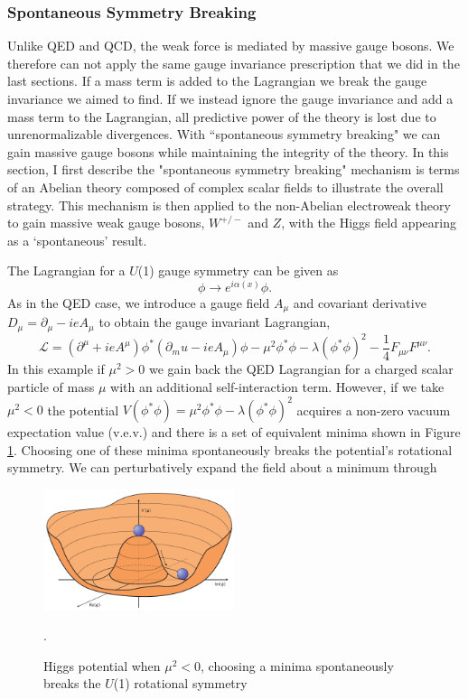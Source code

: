 \subsubsection{Spontaneous Symmetry Breaking}
Unlike QED and QCD, the weak force is mediated by massive gauge bosons. We therefore can not apply the same gauge invariance prescription that we did in the last sections. If a mass term is added to the Lagrangian we break the gauge invariance we aimed to find. If we instead ignore the gauge invariance and add a mass term to the Lagrangian, all predictive power of the theory is lost due to unrenormalizable divergences. With ``spontaneous symmetry breaking" we can gain massive gauge bosons while maintaining the integrity of the theory. In this section, I first describe the "spontaneous symmetry breaking" mechanism is terms of an Abelian theory composed of complex scalar fields to illustrate the overall strategy. This mechanism is then applied to the non-Abelian electroweak theory to gain massive weak gauge bosons, $W^{+/-}$ and $Z$, with the Higgs field appearing as a `spontaneous' result.

The Lagrangian for a $U$(1) gauge symmetry can be given as 
\begin{equation}
\phi \rightarrow e^{i\alpha(x)}\phi.
\end{equation}
As in the QED case, we introduce a gauge field $A_\mu$ and covariant derivative $D_\mu = \partial_\mu - ieA_\mu$ to obtain the gauge invariant Lagrangian,
\begin{equation}
\mathcal{L} = (\partial^\mu+ieA^\mu)\phi^*(\partial_mu-ieA_\mu)\phi-\mu^2\phi^*\phi-\lambda(\phi^*\phi)^2-\frac{1}{4}F_{\mu\nu}F^{\mu\nu}.
\end{equation}
In this example if $\mu^2>0$ we gain back the QED Lagrangian for a charged scalar particle of mass $\mu$ with an additional self-interaction term. However, if we take $\mu^2<0$ the potential $V(\phi^*\phi)=\mu^2\phi^*\phi-\lambda(\phi^*\phi)^2$ acquires a non-zero vacuum expectation value (v.e.v.) and there is a set of equivalent minima shown in Figure \ref{fig:HiggsPotential}. Choosing one of these minima spontaneously breaks the potential's rotational symmetry. We can perturbatively expand the field about a minimum through
\begin{figure}[H]
    \centering
    \includegraphics[width=0.5\textwidth] {Pictures/HiggsPotential.png}\hspace{1cm}
    \caption{Higgs potential when $\mu^2<0$, choosing a minima spontaneously breaks the $U$(1) rotational symmetry \cite{HiggsPotential}}.
    \label{fig:HiggsPotential}
\end{figure}

